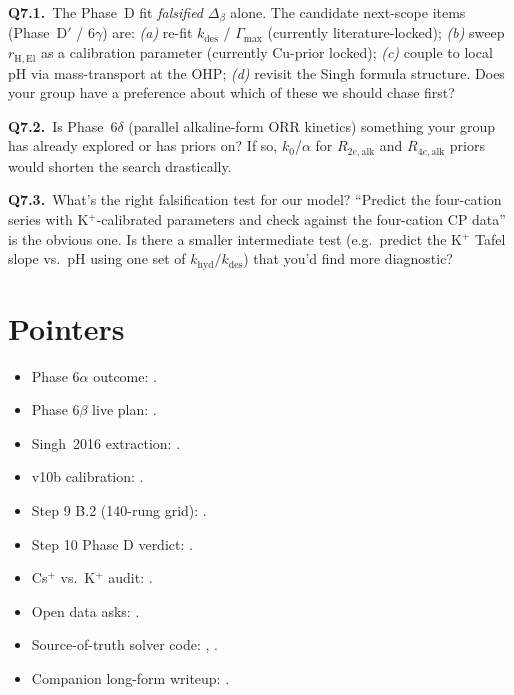 \documentclass[11pt]{article}
\begin{document}
\begin{questionbox}[Q7: Process]
\textbf{Q7.1.}~The Phase~D fit \emph{falsified} $\Delta_\beta$ alone.
The candidate next-scope items (Phase~D$'$ / 6$\gamma$) are:
\emph{(a)} re-fit $k_{\mathrm{des}}$ / $\Gamma_{\max}$ (currently
literature-locked); \emph{(b)} sweep $r_{\mathrm{H,El}}$ as a calibration
parameter (currently Cu-prior locked); \emph{(c)} couple to local pH
via mass-transport at the OHP; \emph{(d)} revisit the Singh formula
structure.  Does your group have a preference about which of these we
should chase first?

\textbf{Q7.2.}~Is Phase~6$\delta$ (parallel alkaline-form ORR kinetics)
something your group has already explored or has priors on?  If so,
$k_0$/$\alpha$ for $R_{2e,\mathrm{alk}}$ and $R_{4e,\mathrm{alk}}$
priors would shorten the search drastically.

\textbf{Q7.3.}~What's the right falsification test for our model?
``Predict the four-cation series with K$^+$-calibrated parameters
and check against the four-cation CP data'' is the obvious one.  Is
there a smaller intermediate test (e.g.\ predict the K$^+$ Tafel
slope vs.\ pH using one set of $k_{\mathrm{hyd}}/k_{\mathrm{des}}$)
that you'd find more diagnostic?
\end{questionbox}

\section*{Pointers}

\begin{itemize}[leftmargin=*,nosep]\small
\item Phase 6$\alpha$ outcome: .
\item Phase 6$\beta$ live plan: .
\item Singh~2016 extraction: .
\item v10b calibration: .
\item Step 9 B.2 (140-rung grid): .
\item Step 10 Phase D verdict: .
\item Cs$^+$ vs.\ K$^+$ audit: .
\item Open data asks: .
\item Source-of-truth solver code:
  ,
  .
\item Companion long-form writeup: .
\end{itemize}
\end{document}
